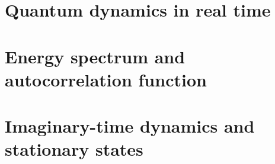 \section*{Quantum dynamics in real time}


\lstset{style=mystyle}


\section*{Energy spectrum and autocorrelation function}

\lstset{style=mystyle}


\section*{Imaginary-time dynamics and stationary states}

\lstset{style=mystyle}
